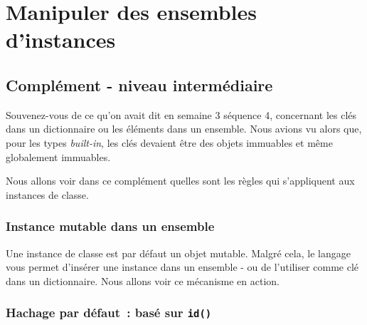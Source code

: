     
    
    
    

    

    \hypertarget{manipuler-des-ensembles-dinstances}{%
\section{Manipuler des ensembles
d'instances}\label{manipuler-des-ensembles-dinstances}}

    \hypertarget{compluxe9ment---niveau-intermuxe9diaire}{%
\subsection{Complément - niveau
intermédiaire}\label{compluxe9ment---niveau-intermuxe9diaire}}

    Souvenez-vous de ce qu'on avait dit en semaine 3 séquence 4, concernant
les clés dans un dictionnaire ou les éléments dans un ensemble. Nous
avions vu alors que, pour les types \emph{built-in}, les clés devaient
être des objets immuables et même globalement immuables.

    Nous allons voir dans ce complément quelles sont les règles qui
s'appliquent aux instances de classe.

    \hypertarget{instance-mutable-dans-un-ensemble}{%
\subsubsection{Instance mutable dans un
ensemble}\label{instance-mutable-dans-un-ensemble}}

    Une instance de classe est par défaut un objet mutable. Malgré cela, le
langage vous permet d'insérer une instance dans un ensemble - ou de
l'utiliser comme clé dans un dictionnaire. Nous allons voir ce mécanisme
en action.

    \hypertarget{hachage-par-duxe9faut-basuxe9-sur-id}{%
\subsubsection{\texorpdfstring{Hachage par défaut~: basé sur
\texttt{id()}}{Hachage par défaut~: basé sur id()}}\label{hachage-par-duxe9faut-basuxe9-sur-id}}

